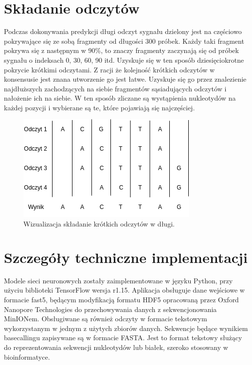 \documentclass[a4paper,11pt,twoside]{report}
\theoremstyle{definition}
\begin{document}
\section{Składanie odczytów}

Podczas dokonywania predykcji długi odczyt sygnału dzielony jest na częściowo pokrywające się ze sobą fragmenty od długości 300 próbek. Każdy taki fragment pokrywa się z następnym w 90\%, to znaczy fragmenty zaczynają się od próbek sygnału o indeksach 0, 30, 60, 90 itd. Uzyskuje się w ten sposób dziesięciokrotne pokrycie krótkimi odczytami. Z racji że kolejność krótkich odczytów w konsensusie jest znana utworzenie go jest łatwe. Uzyskuje się go przez znalezienie najdłuższych zachodzących na siebie fragmentów sąsiadujących odczytów i nałożenie ich na siebie. W ten sposób zliczane są wystąpienia nukleotydów na każdej pozycji i wybierane są te, które pojawiają się najczęściej.

\begin{figure}[h!]
	\centering
	\includegraphics{assembly}
	\caption{Wizualizacja składanie krótkich odczytów w długi.}
\end{figure}

\section{Szczegóły techniczne implementacji}

Modele sieci neuronowych zostały zaimplementowane w języku Python, przy użyciu biblioteki TensorFlow\cite{tensorflow} wersja r1.15. Aplikacja obsługuje dane wejściowe w formacie fast5, będącym modyfikacją formatu HDF5 opracowaną przez Oxford Nanopore Technologies do przechowywania danych z sekwencjonowania MinIONem. Obsługiwane są również odczyty w formacie tekstowym wykorzystanym w jednym z użytych zbiorów danych\cite{chironData}. Sekwencje będące wynikiem basecallingu zapisywane są w formacie FASTA. Jest to format tekstowy służący do reprezentowania sekwencji nukleotydów lub białek, szeroko stosowany w bioinformatyce.
\end{document}
